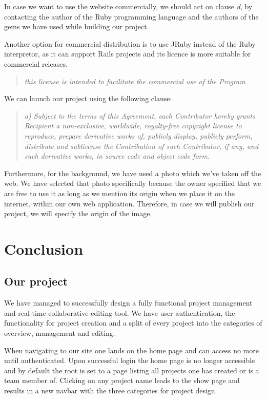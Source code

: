 \documentclass[a4wide, 11pt]{article}
\newenvironment{italicquotes}
{\begin{quote}\itshape\small}
{\end{quote}}
\begin{document}
In case we want to use the website commercially, we should act on clause 
{\it d}, by contacting the author of the Ruby programming language and the
authors of the gems we have used while building our project.

Another option for commercial distribution is to use JRuby instead of the Ruby
interpretor, as it can support Rails projects and its licence is more suitable
for commercial releases.

\begin{italicquotes}
this license is intended to facilitate the commercial use of the Program
\cite{JRubylicence}
\end{italicquotes}

We can launch our project using the following clause:

\begin{italicquotes}
a) Subject to the terms of this Agreement, each Contributor hereby grants
Recipient a non-exclusive, worldwide, royalty-free copyright license to
reproduce, prepare derivative works of, publicly display, publicly perform,
distribute and sublicense the Contribution of such Contributor, if any, and
such derivative works, in source code and object code form.
\cite{JRubylicence}
\end{italicquotes}

Furthermore, for the background, we have used a photo which we've taken off the
web. We have selected that photo specifically because the owner specified that
we are free to use it as long as we mention its origin when we place it on the
internet, within our own web application. Therefore, in case we will publish
our project, we will specify the origin of the image.

\clearpage

\section{Conclusion}

\subsection{Our project}
We have managed to successfully design a fully functional project management and real-time collaborative editing tool. We have user authentication, the functionality for project creation and a  split of every project into the categories of overview, management and editing. 

When navigating to our site one lands on the home page and can access no more until authenticated. Upon successful login the home page is no longer accessible and by default the root is set to a page listing all projects one has created or is a team member of. Clicking on any project name leads to the show page and results in a new navbar with the three categories for project design.
\end{document}
